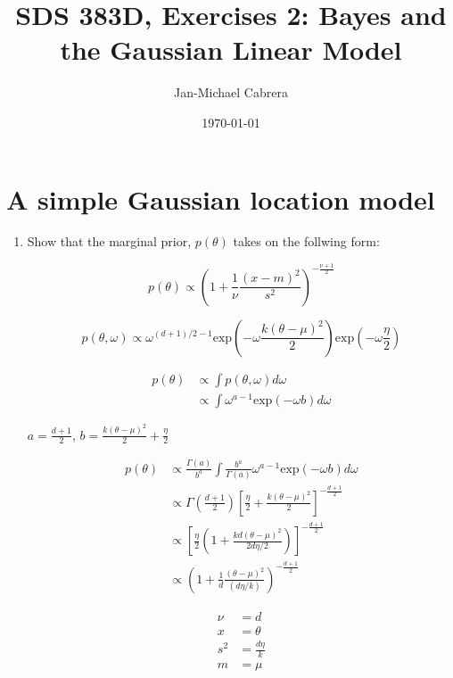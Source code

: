 \documentclass[10pt]{article}
\begin{document}
    \title{SDS 383D, Exercises 2: Bayes and the Gaussian Linear Model}
    \author{Jan-Michael Cabrera}
    \date{\today}
    \maketitle

    \section*{A simple Gaussian location model}

    \begin{enumerate}[label=(\Alph*)]
      \item Show that the marginal prior, $p(\theta)$ takes on the follwing form:

        $$ p(\theta) \propto \left ( 1 + \frac{1}{\nu} \frac{(x - m)^2}{s^2}\right )^{- \frac{\nu + 1}{2}}$$

        $$p(\theta, \omega) \propto \omega^{(d+1)/2 - 1} \text{exp}\left( -\omega \frac{k (\theta - \mu)^2}{2}\right ) \text{exp}\left ( -\omega \frac{\eta}{2}\right)$$

        \begin{align*}
          p(\theta) &\propto \int p(\theta, \omega) d \omega \\
          & \propto \int \omega^{a-1} \text{exp}(- \omega b) d\omega
        \end{align*}

        $a = \frac{d+1}{2}$, $b = \frac{k (\theta - \mu)^2}{2} + \frac{\eta}{2}$

        \begin{align*}
          p(\theta) & \propto \frac{\Gamma(a)}{b^a} \int \frac{b^a}{\Gamma(a)} \omega^{a-1} \text{exp}(- \omega b) d\omega \\
          & \propto \Gamma \left ( \frac{d+1}{2} \right) \left [ \frac{\eta}{2} + \frac{k (\theta - \mu)^2}{2}\right]^{- \frac{d+1}{2}} \\
          & \propto \left [ \frac{\eta}{2} \left (1 + \frac{kd (\theta - \mu)^2}{2 d \eta/2} \right )\right]^{- \frac{d+1}{2}} \\
          & \propto \left ( 1 + \frac{1}{d} \frac{(\theta - \mu)^2}{(d \eta/ k)}\right)^{- \frac{d+1}{2}}
        \end{align*}

        \begin{align*}
          \nu &= d \\
          x &= \theta \\
          s^2 & = \frac{d \eta}{k}\\
          m & = \mu
        \end{align*}



\end{enumerate}
\end{document}
